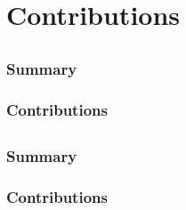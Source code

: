 \documentclass[showtrims]{kthesis}
\begin{document}
\chapter{Contributions}
\renewcommand\thesection{\Alph{section}}
\section{\ppPTP}
\begingroup\centering
\begin{ppBox}
\end{ppBox}
\endgroup

\subsection{Summary}
\subsection{Contributions}

\section{\ppEI}
\begingroup\centering
\begin{ppBox}
\end{ppBox}
\endgroup

\subsection{Summary}
\subsection{Contributions}

\section{\ppDSS}
\begingroup\centering
\begin{ppBox}
\end{ppBox}
\endgroup
\end{document}
